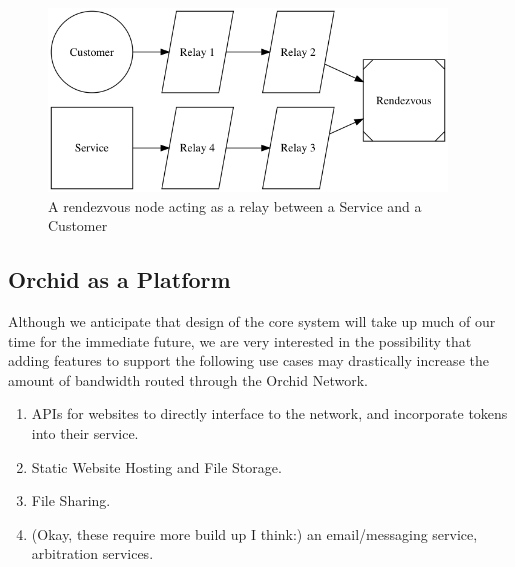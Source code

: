 \documentclass{article}
\begin{document}
\begin{figure}[htbp]
  \centering
  \includegraphics[width = 300pt]{sttRttc}
  \caption{A rendezvous node acting as a relay between a Service and a Customer}
\end{figure}

\subsection{Orchid as a Platform}

Although we anticipate that design of the core system will take up
much of our time for the immediate future, we are very interested in
the possibility that adding features to support the following use
cases may drastically increase the amount of bandwidth routed through
the Orchid Network.

\begin{enumerate}
\item APIs for websites to directly interface to the network, and
  incorporate tokens into their service.
\item Static Website Hosting and File Storage.
\item File Sharing.
\item (Okay, these require more build up I think:) an email/messaging
  service, arbitration services.
\end{enumerate}

\nocite{*}
\printbibliography
\end{document}
